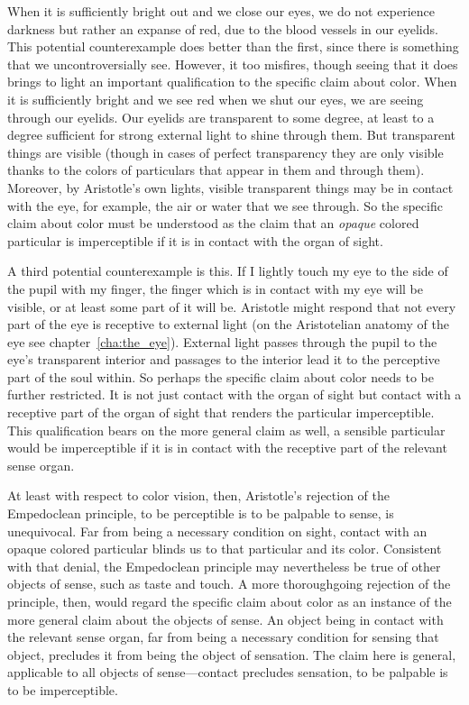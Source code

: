 When it is sufficiently bright out and we close our eyes, we do not experience darkness but rather an expanse of red, due to the blood vessels in our eyelids. This potential counterexample does better than the first, since there is something that we uncontroversially see. However, it too misfires, though seeing that it does brings to light an important qualification to the specific claim about color. When it is sufficiently bright and we see red when we shut our eyes, we are seeing through our eyelids. Our eyelids are transparent to some degree, at least to a degree sufficient for strong external light to shine through them. But transparent things are visible (though in cases of perfect transparency they are only visible thanks to the colors of particulars that appear in them and through them). Moreover, by Aristotle's own lights, visible transparent things may be in contact with the eye, for example, the air or water that we see through. So the specific claim about color must be understood as the claim that an \emph{opaque} colored particular is imperceptible if it is in contact with the organ of sight.

A third potential counterexample is this. If I lightly touch my eye to the side of the pupil with my finger, the finger which is in contact with my eye will be visible, or at least some part of it will be. Aristotle might respond that not every part of the eye is receptive to external light (on the Aristotelian anatomy of the eye see chapter~\ref{cha:the_eye}). External light passes through the pupil to the eye's transparent interior and passages to the interior lead it to the perceptive part of the soul within. So perhaps the specific claim about color needs to be further restricted. It is not just contact with the organ of sight but contact with a receptive part of the organ of sight that renders the particular imperceptible. This qualification bears on the more general claim as well, a sensible particular would be imperceptible if it is in contact with the receptive part of the relevant sense organ.

At least with respect to color vision, then, Aristotle's rejection of the Empedoclean principle, to be perceptible is to be palpable to sense, is unequivocal. Far from being a necessary condition on sight, contact with an opaque colored particular blinds us to that particular and its color. Consistent with that denial, the Empedoclean principle may nevertheless be true of other objects of sense, such as taste and touch. A more thoroughgoing rejection of the principle, then, would regard the specific claim about color as an instance of the more general claim about the objects of sense. An object being in contact with the relevant sense organ, far from being a necessary condition for sensing that object, precludes it from being the object of sensation. The claim here is general, applicable to all objects of sense---contact precludes sensation, to be palpable is to be imperceptible.

